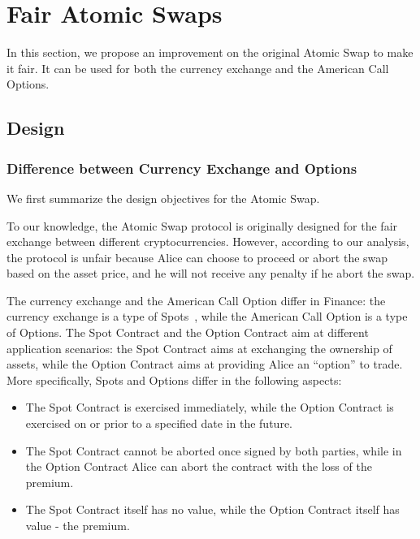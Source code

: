 \section{Fair Atomic Swaps}
\label{sec:fair_atomic_swap}

In this section, we propose an improvement on the original Atomic Swap to make it fair.
It can be used for both the currency exchange and the American Call Options.


\subsection{Design}

\subsubsection{Difference between Currency Exchange and Options}
\label{subsubsec:diff_spot_option}

We first summarize the design objectives for the Atomic Swap.

To our knowledge, the Atomic Swap protocol is originally designed for the fair exchange between different cryptocurrencies.
However, according to our analysis, the protocol is unfair because Alice can choose to proceed or abort the swap based on the asset price, and he will not receive any penalty if he abort the swap.

The currency exchange and the American Call Option differ in Finance: the currency exchange is a type of Spots~\cite{hull1991introduction}, while the American Call Option is a type of Options.
The Spot Contract and the Option Contract aim at different application scenarios: the Spot Contract aims at exchanging the ownership of assets, while the Option Contract aims at providing Alice an ``option'' to trade.
More specifically, Spots and Options differ in the following aspects:

\begin{itemize}
    \item The Spot Contract is exercised immediately, while the Option Contract is exercised on or prior to a specified date in the future.
    \item The Spot Contract cannot be aborted once signed by both parties, while in the Option Contract Alice can abort the contract with the loss of the premium.
    \item The Spot Contract itself has no value, while the Option Contract itself has value - the premium.
\end{itemize}


